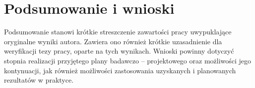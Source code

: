 \section{Podsumowanie i wnioski}
\label{sec:podsumowanie-wnioski}
Podsumowanie stanowi krótkie streszczenie zawartości pracy uwypuklające oryginalne wyniki autora. Zawiera ono również krótkie uzasadnienie dla weryfikacji tezy pracy, oparte na tych wynikach. Wnioski powinny dotyczyć stopnia realizacji przyjętego plany badawczo – projektowego oraz możliwości jego kontynuacji, jak również możliwości zastosowania uzyskanych i planowanych rezultatów w praktyce.